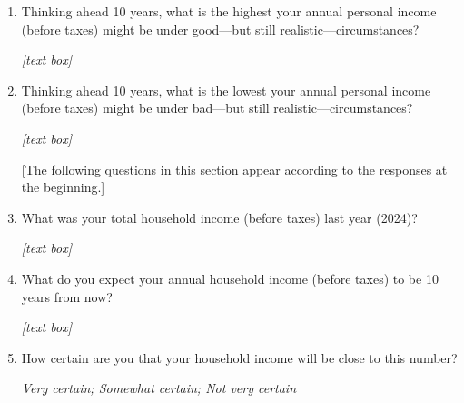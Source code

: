 \documentclass[11pt, headsepline]{article}
\begin{document}
\begin{enumerate}[resume]


     \item Thinking ahead 10 years, what is the highest your annual personal income (before taxes) might be under good—but still realistic—circumstances?

    \textit{[text box]}


    \item Thinking ahead 10 years, what is the lowest your annual personal income (before taxes) might be under bad—but still realistic—circumstances?

    \textit{[text box]}

    [The following questions in this section appear according to the responses at the beginning.]

    \item What was your total household income (before taxes) last year (2024)?

    \textit{[text box]}


    \item What do you expect your annual household income (before taxes) to be 10 years from now? 

    \textit{[text box]}

    \item How certain are you that your household income will be close to this number?

    \textit{Very certain; Somewhat certain; Not very certain}



\end{enumerate}
\end{document}
